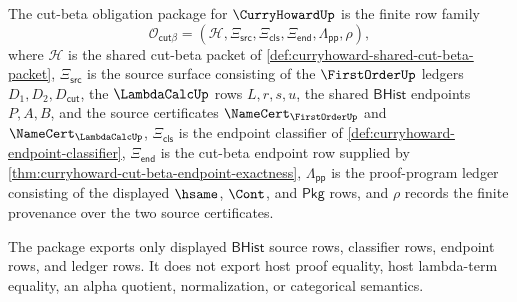 \begin{definition}
\label{def:curryhoward-cut-beta-obligation-package}
The cut-beta obligation package for $\CurryHowardUp$ is the finite row family
$$
\mathcal{O}_{\mathsf{cut}\beta}
=(\mathcal H,\Xi_{\mathsf{src}},\Xi_{\mathsf{cls}},\Xi_{\mathsf{end}},\Lambda_{\mathsf{pp}},\rho),
$$
where $\mathcal H$ is the shared cut-beta packet of
\autoref{def:curryhoward-shared-cut-beta-packet},
$\Xi_{\mathsf{src}}$ is the source surface consisting of the
$\FirstOrderUp$ ledgers $D_1,D_2,D_{\mathsf{cut}}$, the $\LambdaCalcUp$ rows
$L,r,s,u$, the shared $\mathsf{BHist}$ endpoints $P,A,B$, and the source
certificates $\NameCert_{\FirstOrderUp}$ and $\NameCert_{\LambdaCalcUp}$,
$\Xi_{\mathsf{cls}}$ is the endpoint classifier of
\autoref{def:curryhoward-endpoint-classifier}, $\Xi_{\mathsf{end}}$ is the
cut-beta endpoint row supplied by
\autoref{thm:curryhoward-cut-beta-endpoint-exactness},
$\Lambda_{\mathsf{pp}}$ is the proof-program ledger consisting of the displayed
$\hsame$, $\Cont$, and $\mathsf{Pkg}$ rows, and $\rho$ records the finite
provenance over the two source certificates.

The package exports only displayed $\mathsf{BHist}$ source rows, classifier
rows, endpoint rows, and ledger rows. It does not export host proof equality,
host lambda-term equality, an alpha quotient, normalization, or categorical
semantics.
\end{definition}

